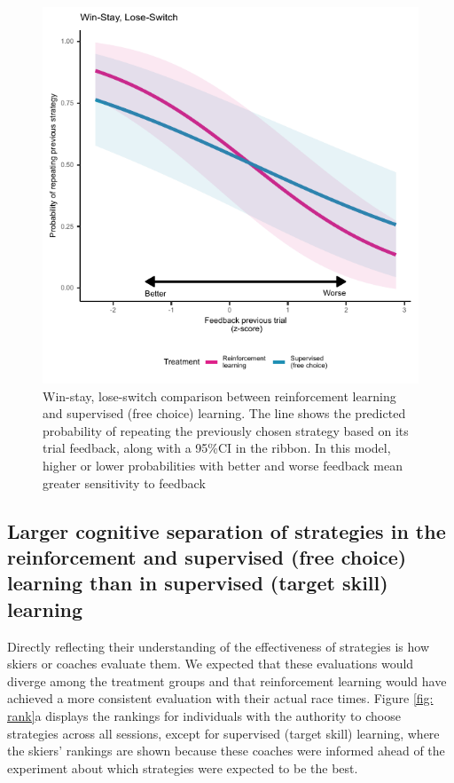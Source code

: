 \documentclass[pdflatex,sn-mathphys-num]{sn-jnl}%
\theoremstyle{thmstyleone}%
\theoremstyle{thmstyletwo}%
\theoremstyle{thmstylethree}%
\begin{document}
\begin{figure}[H]
\centering
\includegraphics{figures/figure_winstaylooseshift.pdf}
\caption{Win-stay, lose-switch comparison between reinforcement learning and supervised (free choice) learning. The line shows the predicted probability of repeating the previously chosen strategy based on its trial feedback, along with a 95\%CI in the ribbon. In this model, higher or lower probabilities with better and worse feedback mean greater sensitivity to feedback}\label{fig: choice_wsls}
\end{figure}



\subsection{Larger cognitive separation of strategies in the reinforcement and supervised (free choice) learning than in supervised (target skill) learning}\label{subsec4}
Directly reflecting their understanding of the effectiveness of strategies is how skiers or coaches evaluate them. We expected that these evaluations would diverge among the treatment groups and that reinforcement learning would have achieved a more consistent evaluation with their actual race times. Figure \ref{fig: rank}a displays the rankings for individuals with the authority  to choose strategies across all sessions, except for supervised (target skill) learning, where the skiers' rankings are shown because these coaches were informed ahead of the experiment about which strategies were expected to be the best. 
\end{document}
